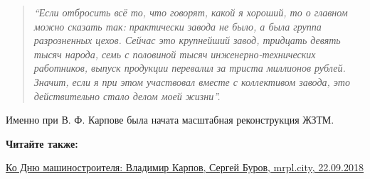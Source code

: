 \begin{quote}
\em\enquote{Если отбросить всё то, что говорят, какой я хороший, то о главном можно
сказать так: практически завода не было, а была группа разрозненных цехов.
Сейчас это крупнейший завод, тридцать девять тысяч народа, семь с половиной
тысяч инженерно-технических работников, выпуск продукции перевалил за триста
миллионов рублей. Значит, если я при этом участвовал вместе с коллективом
завода, это действительно стало делом моей жизни}.
\end{quote}

Именно при В. Ф. Карпове была начата масштабная реконструкция ЖЗТМ.

\textbf{Читайте также:} 

\href{https://archive.org/details/22_09_2018.sergij_burov.mrpl_city.ko_dnju_mashinostroenia_vladimir_karpov}{%
Ко Дню машиностроителя: Владимир Карпов, Сергей Буров, mrpl.city, 22.09.2018}

\clearpage
